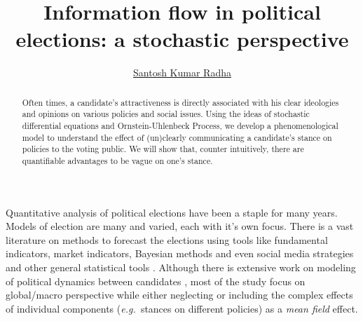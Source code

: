 \documentclass[aps,prl,twocolumn,showpacs,final]{revtex4-2}
\newcommand{\eg}{\textit{e.g.\ }}
\begin{document}
\title{Information flow in political elections: a stochastic perspective}
\author{\href{http://santoshkumarradha.me }{Santosh Kumar Radha}}
\begin{abstract}
	Often times, a candidate's attractiveness is directly associated with his clear ideologies and opinions on various policies and social issues. Using the ideas of stochastic differential equations and Ornstein-Uhlenbeck Process, we develop a phenomenological model to understand the effect of (un)clearly communicating a candidate's stance on policies to the voting public. We will show that, counter intuitively, there are quantifiable advantages to be vague on one's stance. 
\end{abstract}
\maketitle
Quantitative analysis of political elections have been a staple for many years. Models of election are many and varied, each with it’s own focus. There is a vast literature on methods to forecast the elections using tools like fundamental indicators\cite{hummel2013fundamental}, market indicators\cite{berg2008results}, Bayesian methods\cite{linzer2013dynamic} and even social media strategies \cite{gayo2012no} and other general statistical tools \cite{hummel2014fundamental,klarner2008forecasting,lauderdale2015under}. Although there is extensive work on modeling of political dynamics between candidates \cite{bottcher2018clout,braha2017voting,fernandez2014voter,galam2004dynamics}, most of the study focus on global/macro perspective while either neglecting or including the complex effects of individual components (\eg stances on different policies) as a \textit{mean field} effect.
\end{document}
